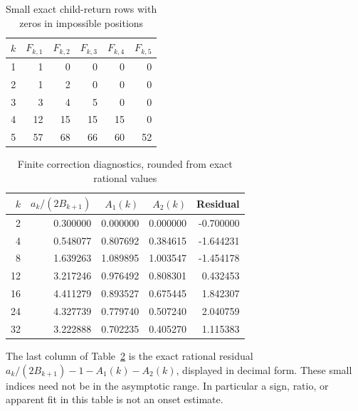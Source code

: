 \documentclass[11pt,letterpaper]{article}
\theoremstyle{remark}\newtheorem{remark}[theorem]{Remark}
\theoremstyle{definition}\newtheorem{definition}[theorem]{Definition}
\begin{document}
\begin{table}[htbp]
\centering\small
\caption{Small exact child-return rows with zeros in impossible positions}
\label{sgm:co:tab:rows}%
\begin{tabular}{r r r r r r}
\toprule
$k$ & $F_{k,1}$ & $F_{k,2}$ & $F_{k,3}$ & $F_{k,4}$ & $F_{k,5}$ \\
\midrule
1 & 1 & 0 & 0 & 0 & 0 \\
2 & 1 & 2 & 0 & 0 & 0 \\
3 & 3 & 4 & 5 & 0 & 0 \\
4 & 12 & 15 & 15 & 15 & 0 \\
5 & 57 & 68 & 66 & 60 & 52 \\
\bottomrule
\end{tabular}
\end{table}
\begin{table}[htbp]
\centering\small\setlength{\tabcolsep}{5pt}
\caption{Finite correction diagnostics, rounded from exact rational values}
\label{sgm:co:tab:corrections}%
\begin{tabular}{r r r r r}
\toprule
$k$ & $a_k/(2B_{k+1})$ & $A_1(k)$ & $A_2(k)$ & Residual \\
\midrule
2 & 0.300000 & 0.000000 & 0.000000 & -0.700000 \\
4 & 0.548077 & 0.807692 & 0.384615 & -1.644231 \\
8 & 1.639263 & 1.089895 & 1.003547 & -1.454178 \\
12 & 3.217246 & 0.976492 & 0.808301 & 0.432453 \\
16 & 4.411279 & 0.893527 & 0.675445 & 1.842307 \\
24 & 4.327739 & 0.779740 & 0.507240 & 2.040759 \\
32 & 3.222888 & 0.702235 & 0.405270 & 1.115383 \\
\bottomrule
\end{tabular}
\end{table}
The last column of Table~\ref{sgm:co:tab:corrections} is the exact rational residual $a_k/(2B_{k+1})-1-A_1(k)-A_2(k)$, displayed in decimal form. These small indices need not be in the asymptotic range. In particular a sign, ratio, or apparent fit in this table is not an onset estimate.
\end{document}
